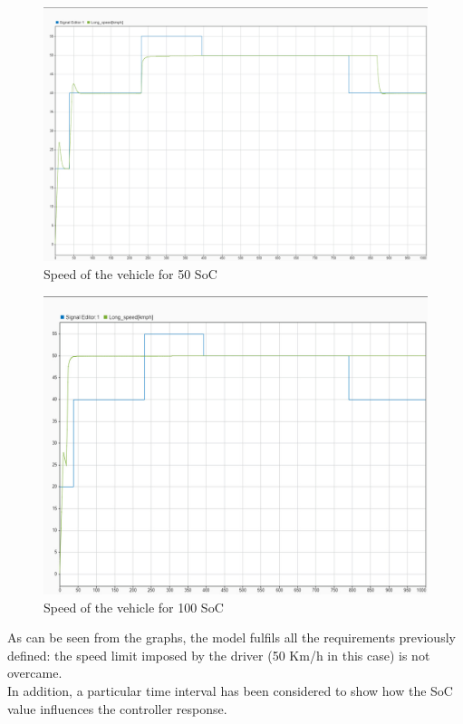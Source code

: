 \documentclass[12pt,a4paper]{report}
\begin{document}
\begin{figure}[htbp]
	\centering
	\includegraphics[scale=0.2]{50_soc.jpeg}
	\caption{Speed of the vehicle for 50 SoC}
\end{figure}

\begin{figure}[htbp]
	\centering
	\includegraphics[scale=0.28]{100_soc.jpeg}
	\caption{Speed of the vehicle for 100 SoC}
\end{figure}
\FloatBarrier
As can be seen from the graphs, the model fulfils all the requirements previously defined: the speed limit imposed by the driver (50 Km/h in this case) is not overcame.\\
In addition, a particular time interval has been considered to show how the SoC value influences the controller response.\\
\FloatBarrier
\end{document}
